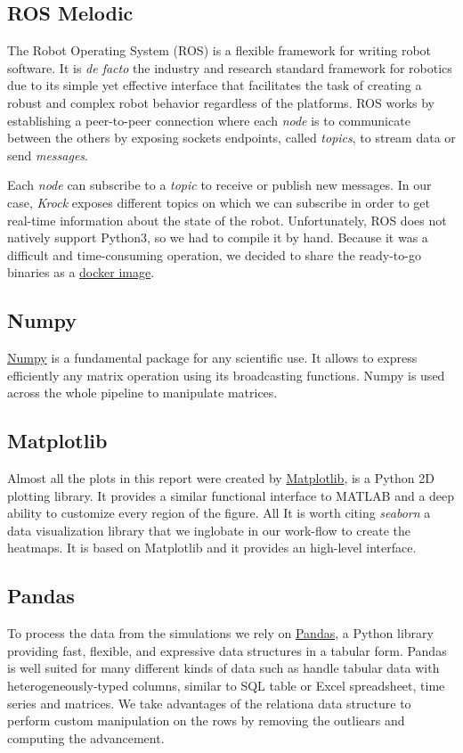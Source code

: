 \documentclass[../document.tex]{subfiles}
\begin{document}
\subsection{ROS Melodic}
The Robot Operating System (ROS) \cite{ROS} is a flexible framework for writing robot software. It is \emph{de facto} the industry and research standard framework for robotics due to its simple yet effective interface that facilitates the task of creating a robust and complex robot behavior regardless of the platforms. ROS works by establishing a peer-to-peer connection where each \emph{node} is to communicate between the others by exposing sockets endpoints, called \emph{topics}, to stream data or send \emph{messages}. 

Each \emph{node} can subscribe to a \emph{topic} to receive or publish new messages. In our case, \emph{Krock} exposes different topics on which we can subscribe in order to get real-time information about the state of the robot.
Unfortunately, ROS does not natively support Python3, so we had to compile it by hand. Because it was a difficult and time-consuming operation, we decided to share the ready-to-go binaries as a \href{https://hub.docker.com/r/zuppif/ros-melodic-python3/}{docker image}. 


\subsection{Numpy}
\href{https://www.numpy.org/}{Numpy} is a fundamental package for any scientific use. It allows to express efficiently any matrix operation using its broadcasting functions. Numpy is used across the whole pipeline to manipulate matrices.

\subsection{Matplotlib}
Almost all the plots in this report were created by \href{https://matplotlib.org/}{Matplotlib}, is a Python 2D plotting library. It provides a similar functional interface to MATLAB and a deep ability to customize every region of the figure. All 
It is worth citing \emph{seaborn} a data visualization library that we inglobate in our work-flow to create the heatmaps. It is based on Matplotlib and it provides an high-level interface.
\subsection{Pandas}
To process the data from the simulations we rely on \href{https://pandas.pydata.org/}{Pandas}, a Python library providing fast, flexible, and expressive data structures in a tabular form. Pandas is well suited for many different kinds of data such as handle tabular data with heterogeneously-typed columns, similar to SQL table or Excel spreadsheet, time series and matrices. We take advantages of the relationa data structure to perform custom manipulation on the rows by removing the outliears and computing the advancement.
\end{document}
